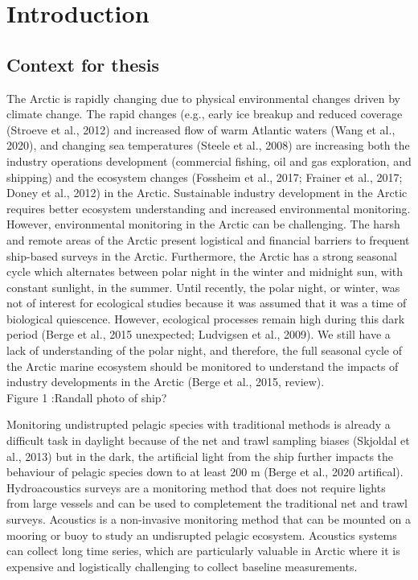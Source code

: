 \chapter{Introduction}
\label{chap:intro}

\section{Context for thesis}
The Arctic is rapidly changing due to physical environmental changes driven by climate change. The rapid changes (e.g., early ice breakup and reduced coverage (Stroeve et al., 2012) and increased flow of warm Atlantic waters (Wang et al., 2020), and changing sea temperatures (Steele et al., 2008) are increasing both the industry operations development (commercial fishing, oil and gas exploration, and shipping) and the ecosystem changes (Fossheim et al., 2017; Frainer et al., 2017; Doney et al., 2012) in the Arctic.
Sustainable industry development in the Arctic requires better ecosystem understanding and increased environmental monitoring. However, environmental monitoring in the Arctic can be challenging. The harsh and remote areas of the Arctic present logistical and financial barriers to frequent ship-based surveys in the Arctic. Furthermore, the Arctic has a strong seasonal cycle which alternates between polar night in the winter and midnight sun, with constant sunlight, in the summer. Until recently, the polar night, or winter, was not of interest for ecological studies because it was assumed that it was a time of biological quiescence. However, ecological processes remain high during this dark period (Berge et al., 2015 unexpected; Ludvigsen et al., 2009). We still have a lack of understanding of the polar night, and therefore, the full seasonal cycle of the Arctic marine ecosystem should be monitored to understand the impacts of industry developments in the Arctic (Berge et al., 2015, review). \\

Figure 1 :Randall photo of ship?

Monitoring undistrupted pelagic species with traditional methods is already a difficult task in daylight because of the net and trawl sampling biases (Skjoldal et al., 2013) but in the dark, the artificial light from the ship further impacts the behaviour of pelagic species down to at least 200 m (Berge et al., 2020 artifical). Hydroacoustics surveys are a monitoring method that does not require lights from large vessels and can be used to completement the traditional net and trawl surveys. Acoustics is a non-invasive monitoring method that can be mounted on a mooring or buoy to study an undisrupted pelagic ecosystem. Acoustics systems can collect long time series, which are particularly valuable in Arctic where it is expensive and logistically challenging to collect baseline measurements.\\

